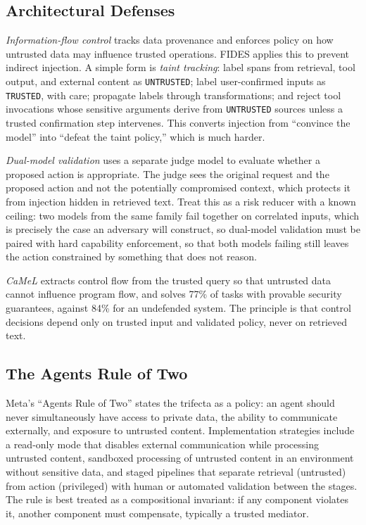 \documentclass[11pt]{book}
\begin{document}
\subsection{Architectural Defenses}

\textit{Information-flow control} tracks data provenance and enforces policy on how untrusted data may influence trusted operations. FIDES \cite{fides2025} applies this to prevent indirect injection. A simple form is \textit{taint tracking}: label spans from retrieval, tool output, and external content as \texttt{UNTRUSTED}; label user-confirmed inputs as \texttt{TRUSTED}, with care; propagate labels through transformations; and reject tool invocations whose sensitive arguments derive from \texttt{UNTRUSTED} sources unless a trusted confirmation step intervenes. This converts injection from ``convince the model'' into ``defeat the taint policy,'' which is much harder.

\textit{Dual-model validation} uses a separate judge model to evaluate whether a proposed action is appropriate. The judge sees the original request and the proposed action and not the potentially compromised context, which protects it from injection hidden in retrieved text. Treat this as a risk reducer with a known ceiling: two models from the same family fail together on correlated inputs, which is precisely the case an adversary will construct, so dual-model validation must be paired with hard capability enforcement, so that both models failing still leaves the action constrained by something that does not reason.

\textit{CaMeL} \cite{camel2025} extracts control flow from the trusted query so that untrusted data cannot influence program flow, and solves 77\% of tasks with provable security guarantees, against 84\% for an undefended system. The principle is that control decisions depend only on trusted input and validated policy, never on retrieved text.

\subsection{The Agents Rule of Two}

Meta's ``Agents Rule of Two'' \cite{ruleoftwo2025} states the trifecta as a policy: an agent should never simultaneously have access to private data, the ability to communicate externally, and exposure to untrusted content. Implementation strategies include a read-only mode that disables external communication while processing untrusted content, sandboxed processing of untrusted content in an environment without sensitive data, and staged pipelines that separate retrieval (untrusted) from action (privileged) with human or automated validation between the stages. The rule is best treated as a compositional invariant: if any component violates it, another component must compensate, typically a trusted mediator.
\end{document}
